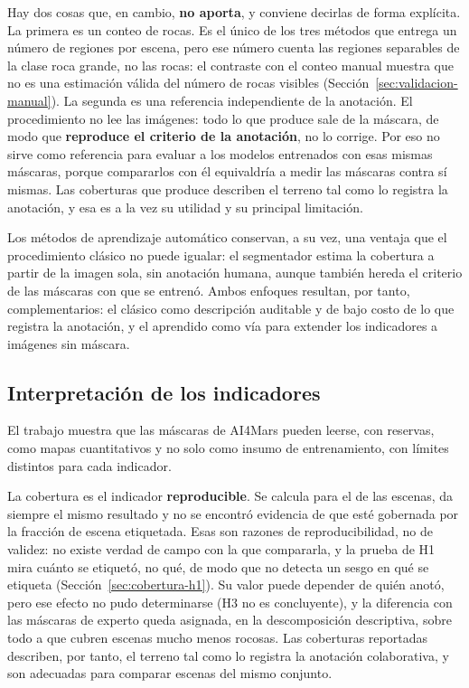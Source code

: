 Hay dos cosas que, en cambio, \textbf{no aporta}, y conviene decirlas de forma explícita. La
primera es un conteo de rocas. Es el único de los tres métodos que entrega un número de regiones
por escena, pero ese número cuenta las regiones separables de la clase roca grande, no las rocas:
el contraste con el conteo manual muestra que no es una estimación válida del número de rocas
visibles (Sección~\ref{sec:validacion-manual}). La segunda es una referencia independiente de la
anotación. El procedimiento no lee las imágenes: todo lo que produce sale de la máscara, de modo
que \textbf{reproduce el criterio de la anotación}, no lo corrige. Por eso no sirve como
referencia para evaluar a los modelos entrenados con esas mismas máscaras, porque compararlos con
él equivaldría a medir las máscaras contra sí mismas. Las coberturas que produce describen el
terreno tal como lo registra la anotación, y esa es a la vez su utilidad y su principal
limitación.

Los métodos de aprendizaje automático conservan, a su vez, una ventaja que el procedimiento
clásico no puede igualar: el segmentador estima la cobertura a partir de la imagen sola, sin
anotación humana, aunque también hereda el criterio de las máscaras con que se entrenó. Ambos
enfoques resultan, por tanto, complementarios: el clásico como descripción auditable y de bajo
costo de lo que registra la anotación, y el aprendido como vía para extender los indicadores a
imágenes sin máscara.

\subsection{Interpretación de los indicadores}

El trabajo muestra que las máscaras de AI4Mars pueden leerse, con reservas, como mapas
cuantitativos y no solo como insumo de entrenamiento, con límites distintos para cada
indicador.

La cobertura es el indicador \textbf{reproducible}. Se calcula para el \cPctCobCalc{} de las
escenas, da siempre el mismo resultado y no se encontró evidencia de que esté gobernada por la
fracción de escena etiquetada. Esas son razones de reproducibilidad, no de validez: no existe
verdad de campo con la que compararla, y la prueba de H1 mira cuánto se etiquetó, no qué, de
modo que no detecta un sesgo en qué se etiqueta (Sección~\ref{sec:cobertura-h1}). Su valor puede depender de quién anotó, pero ese efecto no pudo determinarse (H3 no es concluyente), y la
diferencia con las máscaras de experto queda asignada, en la descomposición descriptiva, sobre
todo a que cubren escenas mucho menos rocosas. Las coberturas reportadas describen, por tanto, el terreno tal como lo
registra la anotación colaborativa, y son adecuadas para comparar escenas del mismo conjunto.

